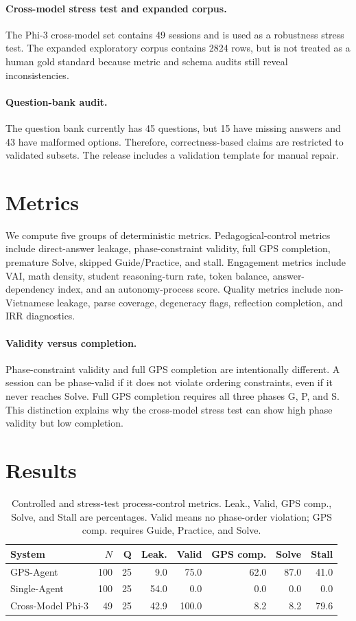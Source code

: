 \documentclass[11pt]{article}
\begin{document}
\paragraph{Cross-model stress test and expanded corpus.} The Phi-3 cross-model set contains 49 sessions and is used as a robustness stress test. The expanded exploratory corpus contains 2824 rows, but is not treated as a human gold standard because metric and schema audits still reveal inconsistencies.

\paragraph{Question-bank audit.} The question bank currently has 45 questions, but 15 have missing answers and 43 have malformed options. Therefore, correctness-based claims are restricted to validated subsets. The release includes a validation template for manual repair.

\section{Metrics}
We compute five groups of deterministic metrics. Pedagogical-control metrics include direct-answer leakage, phase-constraint validity, full GPS completion, premature Solve, skipped Guide/Practice, and stall. Engagement metrics include VAI, math density, student reasoning-turn rate, token balance, answer-dependency index, and an autonomy-process score. Quality metrics include non-Vietnamese leakage, parse coverage, degeneracy flags, reflection completion, and IRR diagnostics.

\paragraph{Validity versus completion.} Phase-constraint validity and full GPS completion are intentionally different. A session can be phase-valid if it does not violate ordering constraints, even if it never reaches Solve. Full GPS completion requires all three phases G, P, and S. This distinction explains why the cross-model stress test can show high phase validity but low completion.

\section{Results}
\begin{table}[t]
\centering
\small
\begin{tabular}{lrrrrrrr}
\toprule
System & $N$ & Q & Leak. & Valid & GPS comp. & Solve & Stall \\
\midrule
GPS-Agent & 100 & 25 & 9.0 & 75.0 & 62.0 & 87.0 & 41.0 \\
Single-Agent & 100 & 25 & 54.0 & 0.0 & 0.0 & 0.0 & 0.0 \\
Cross-Model Phi-3 & 49 & 25 & 42.9 & 100.0 & 8.2 & 8.2 & 79.6 \\
\bottomrule
\end{tabular}
\caption{Controlled and stress-test process-control metrics. Leak., Valid, GPS comp., Solve, and Stall are percentages. Valid means no phase-order violation; GPS comp. requires Guide, Practice, and Solve.}
\label{tab:main}
\end{table}
\end{document}

